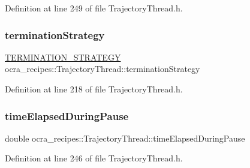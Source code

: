 Definition at line 249 of file Trajectory\+Thread.\+h.

\hypertarget{classocra__recipes_1_1TrajectoryThread_a3bbd0bd08a9ad023c025722486b1c118}{}\label{classocra__recipes_1_1TrajectoryThread_a3bbd0bd08a9ad023c025722486b1c118} 
\subsubsection{\texorpdfstring{termination\+Strategy}{terminationStrategy}}
{\footnotesize\ttfamily \hyperlink{namespaceocra__recipes_afcf7ca623a6c39b246aa4bda629c7309}{T\+E\+R\+M\+I\+N\+A\+T\+I\+O\+N\+\_\+\+S\+T\+R\+A\+T\+E\+GY} ocra\+\_\+recipes\+::\+Trajectory\+Thread\+::termination\+Strategy\hspace{0.3cm}{\ttfamily [protected]}}



Definition at line 218 of file Trajectory\+Thread.\+h.

\hypertarget{classocra__recipes_1_1TrajectoryThread_a3aa38677a7e98b6a6deec0b29a903844}{}\label{classocra__recipes_1_1TrajectoryThread_a3aa38677a7e98b6a6deec0b29a903844} 
\subsubsection{\texorpdfstring{time\+Elapsed\+During\+Pause}{timeElapsedDuringPause}}
{\footnotesize\ttfamily double ocra\+\_\+recipes\+::\+Trajectory\+Thread\+::time\+Elapsed\+During\+Pause\hspace{0.3cm}{\ttfamily [protected]}}



Definition at line 246 of file Trajectory\+Thread.\+h.

\hypertarget{classocra__recipes_1_1TrajectoryThread_a87ec388c22716d82bca31dbf89a21cb3}{}\label{classocra__recipes_1_1TrajectoryThread_a87ec388c22716d82bca31dbf89a21cb3} 
